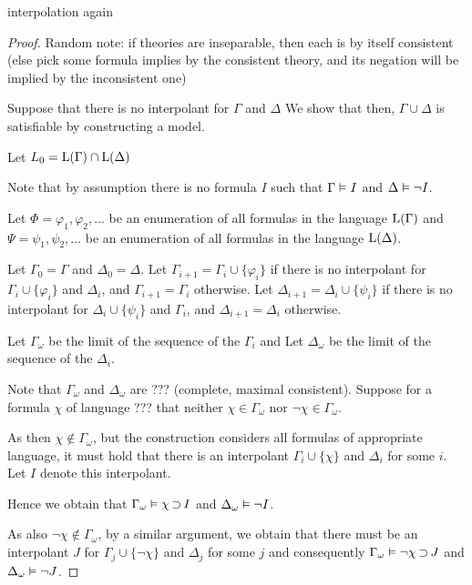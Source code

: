\begin{thm}
	interpolation again
\end{thm}
\begin{proof}
	Random note: if theories are inseparable, then each is by itself consistent (else pick some formula implies by the consistent theory, and its negation will be implied by the inconsistent one)


	Suppose that there is no interpolant for $\Gamma$ and $\Delta$
	We show that then, $\Gamma\cup\Delta$ is satisfiable by constructing a model.

	Let $L_0 = \operatorname{L}(\Gamma) \cap \operatorname{L}(\Delta)$

	Note that by assumption there is no formula $I$ such that $\Gamma\vDash I$ and $\Delta \vDash \lnot I$.



	Let $\Phi = \varphi_1, \varphi_2, \dots$ be an enumeration of all formulas in the language $\operatorname{L}(\Gamma)$
	and
	$\Psi = \psi_1, \psi_2, \dots$ be an enumeration of all formulas in the language $\operatorname{L}(\Delta)$.

	Let $\Gamma_0 = \Gamma$
	and $\Delta_0 = \Delta$.
	Let $\Gamma_{i+1} = \Gamma_i \cup \{\varphi_i\}$ if there is no interpolant for $\Gamma_i \cup \{\varphi_i\}$ and $\Delta_i$, and $\Gamma_{i+1} = \Gamma_i$ otherwise.
	Let $\Delta_{i+1} = \Delta_i \cup \{\psi_i\}$ if there is no interpolant for $\Delta_i \cup \{\psi_i\}$ and $\Gamma_i$, and $\Delta_{i+1} = \Delta_i$ otherwise.

	Let $\Gamma_\omega$ be the limit of the sequence of the $\Gamma_i$ and
	Let $\Delta_\omega$ be the limit of the sequence of the $\Delta_i$.

	Note that $\Gamma_\omega$ and $\Delta_\omega$ are ??? (complete, maximal consistent).
	Suppose for a formula $\chi$ of language ??? that neither
	$\chi \in \Gamma_\omega$
	nor
	$\lnot\chi \in \Gamma_\omega$.

As then $\chi \not\in \Gamma_\omega$, but the construction considers all formulas of appropriate language, it must hold that there is an interpolant $\Gamma_i \cup \{\chi\}$ and $\Delta_i$ for some $i$.
Let $I$ denote this interpolant.

Hence we obtain that $\Gamma_\omega \vDash \chi \operatorname{\supset} I$ 
and $\Delta_\omega \vDash \lnot I$.

As also $\lnot\chi \not\in \Gamma_\omega$, by a similar argument, we obtain that 
there must be an interpolant $J$ for $\Gamma_j \cup \{\lnot \chi\}$ and $\Delta_j$ for some $j$ and consequently
$\Gamma_\omega \vDash \lnot \chi \operatorname{\supset} J$ 
and $\Delta_\omega \vDash \lnot J$.


\end{proof}
